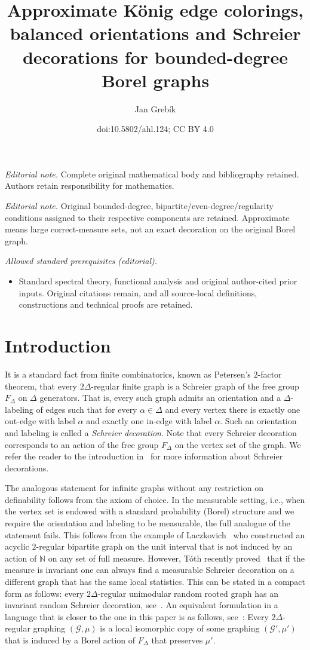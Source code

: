 \documentclass[10pt]{amsart}
\title{Approximate König edge colorings, balanced orientations and Schreier decorations for bounded-degree Borel graphs}
\author{Jan Grebík}
\date{doi:10.5802/ahl.124; CC BY 4.0}
\theoremstyle{definition}
\newcommand{\clG}{\mathcal{G}}
\newcommand{\bbZ}{\mathbb{N}}
\begin{document}
\maketitle
\noindent\textit{Editorial note.} Complete original mathematical body and bibliography retained. Authors retain responsibility for mathematics.\par\medskip
\noindent\textit{Editorial note.} Original bounded-degree, bipartite/even-degree/regularity conditions assigned to their respective components are retained. Approximate means large correct-measure sets, not an exact decoration on the original Borel graph.\par\medskip
\noindent\textit{Allowed standard prerequisites (editorial).}\begin{itemize}
\item Standard spectral theory, functional analysis and original author-cited prior inputs. Original citations remain, and all source-local definitions, constructions and technical proofs are retained.
\end{itemize}\medskip
\section{Introduction}

It is a standard fact from finite combinatorics, known as Petersen's $2$-factor theorem, that every $2\Delta$-regular finite graph is a Schreier graph of the free group $F_\Delta$ on $\Delta$ generators. That is, every such graph admits an orientation and a $\Delta$-labeling of edges such that for every $\alpha\in \Delta$ and every vertex there is exactly one out-edge with label $\alpha$ and exactly one in-edge with label $\alpha$. Such an orientation and labeling is called a \emph{Schreier decoration}. Note that every Schreier decoration corresponds to an action of the free group $F_{\Delta}$ on the vertex set of the graph. We refer the reader to the introduction in~\cite{Laszlo} for more information about Schreier decorations.

The analogous statement for infinite graphs without any restriction on definability follows from the axiom of choice. In the measurable setting, i.e., when the vertex set is endowed with a standard probability (Borel) structure and we require the orientation and labeling to be measurable, the full analogue of the statement fails. This follows from the example of Laczkovich~\cite{Laczkovich} who constructed an acyclic $2$-regular bipartite graph on the unit interval that is not induced by an action of $\bbZ$ on any set of full measure. However, Tóth recently proved~\cite{Laszlo} that if the measure is invariant one can always find a measurable Schreier decoration on a different graph that has the same local statistics. This can be stated in a compact form as follows: every $2\Delta$-regular unimodular random rooted graph has an invariant random Schreier decoration, see~\cite[Theorem~1]{Laszlo}. An equivalent formulation in a language that is closer to the one in this paper is as follows, see~\cite[Corollary~4]{Laszlo}: Every $2\Delta$-regular graphing $(\clG,\mu)$ is a local isomorphic copy of some graphing $(\clG',\mu')$ that is induced by a Borel action of $F_\Delta$ that preserves $\mu'$.
\end{document}
